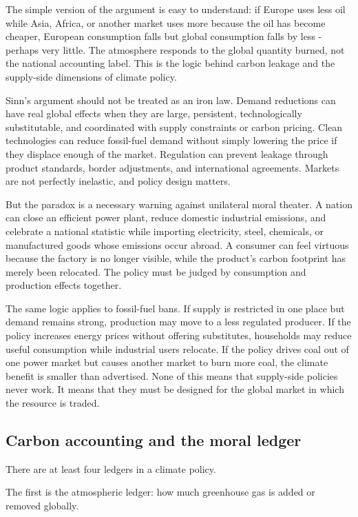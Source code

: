 ﻿\documentclass[12pt,a4paper]{book}
\begin{document}
The simple version of the argument is easy to understand: if Europe uses less oil while Asia, Africa, or another market uses more because the oil has become cheaper, European consumption falls but global consumption falls by less - perhaps very little. The atmosphere responds to the global quantity burned, not the national accounting label. This is the logic behind carbon leakage and the supply-side dimensions of climate policy.

Sinn's argument should not be treated as an iron law. Demand reductions can have real global effects when they are large, persistent, technologically substitutable, and coordinated with supply constraints or carbon pricing. Clean technologies can reduce fossil-fuel demand without simply lowering the price if they displace enough of the market. Regulation can prevent leakage through product standards, border adjustments, and international agreements. Markets are not perfectly inelastic, and policy design matters.

But the paradox is a necessary warning against unilateral moral theater. A nation can close an efficient power plant, reduce domestic industrial emissions, and celebrate a national statistic while importing electricity, steel, chemicals, or manufactured goods whose emissions occur abroad. A consumer can feel virtuous because the factory is no longer visible, while the product's carbon footprint has merely been relocated. The policy must be judged by consumption and production effects together.

The same logic applies to fossil-fuel bans. If supply is restricted in one place but demand remains strong, production may move to a less regulated producer. If the policy increases energy prices without offering substitutes, households may reduce useful consumption while industrial users relocate. If the policy drives coal out of one power market but causes another market to burn more coal, the climate benefit is smaller than advertised. None of this means that supply-side policies never work. It means that they must be designed for the global market in which the resource is traded.

\subsection{Carbon accounting and the moral ledger}
There are at least four ledgers in a climate policy.

The first is the atmospheric ledger: how much greenhouse gas is added or removed globally.
\end{document}
